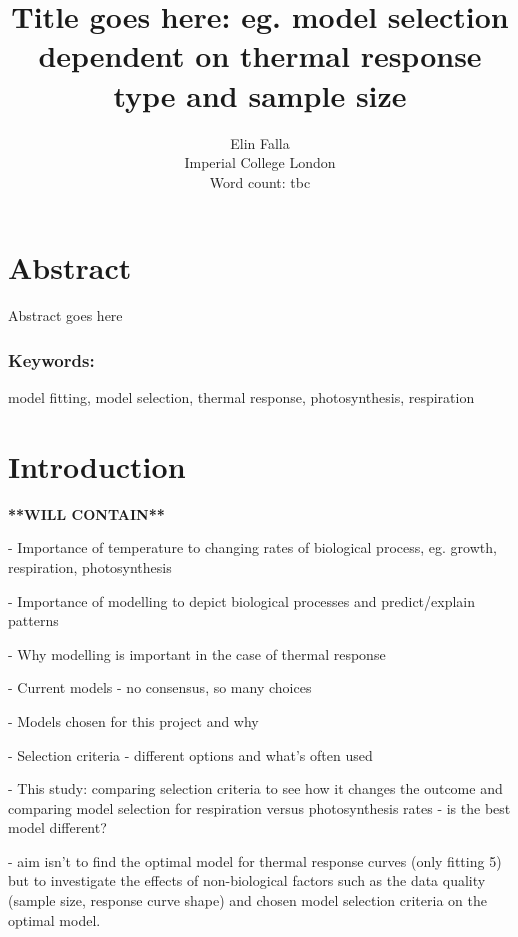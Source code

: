 \documentclass[11pt]{article}
\begin{document}
\setlength{\parindent}{0pt} %


\title{Title goes here: eg. model selection dependent on thermal response type and sample size}
\author{Elin Falla\\Imperial College London
\\ Word count: tbc}
\date{}
\maketitle
\pagebreak

\section*{Abstract}
Abstract goes here
\subsubsection*{Keywords:}
model fitting, model selection, thermal response, photosynthesis, respiration
\\

\hrulefill

\section{Introduction}

\textbf{**WILL CONTAIN**}

- Importance of temperature to changing rates of biological process, eg. growth, respiration, photosynthesis

- Importance of modelling to depict biological processes and predict/explain patterns

- Why modelling is important in the case of thermal response

- Current models - no consensus, so many choices

- Models chosen for this project and why

- Selection criteria - different options and what's often used

- This study: comparing selection criteria to see how it changes the outcome and comparing model selection for respiration versus photosynthesis rates - is the best model different?

- aim isn't to find the optimal model for thermal response curves (only fitting 5) but to investigate the effects of non-biological factors such as the data quality (sample size, response curve shape) and chosen model selection criteria on the optimal model. 
\end{document}
